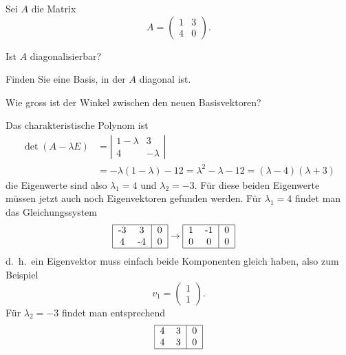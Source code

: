 Sei $A$ die Matrix
\[
A=\begin{pmatrix}
1&3\\
4&0
\end{pmatrix}.
\]
\begin{teilaufgaben}
\item Ist $A$ diagonalisierbar?
\item Finden Sie eine Basis, in der $A$ diagonal ist.
\item Wie gross ist der Winkel zwischen den neuen Basisvektoren?
\end{teilaufgaben}


\begin{loesung}
Das charakteristische Polynom ist
\begin{align*}
\det(A-\lambda E)
&=\left|\begin{matrix}
1-\lambda&3\\
4&-\lambda
\end{matrix}\right|
\\
&=-\lambda(1-\lambda)-12=\lambda^2-\lambda-12=(\lambda -4)(\lambda + 3)
\end{align*}
die Eigenwerte sind also $\lambda_1 = 4$ und $\lambda_2=-3$.
Für diese beiden Eigenwerte müssen jetzt auch noch Eigenvektoren
gefunden werden. Für $\lambda_1=4$ findet man das Gleichungssystem
\begin{align*}
\begin{tabular}{|cc|c|}
\hline
-3&3&0\\
4&-4&0\\
\hline
\end{tabular}
&\rightarrow
\begin{tabular}{|cc|c|}
\hline
1&-1&0\\
0&0&0\\
\hline
\end{tabular}
\end{align*}
d.~h.~ein Eigenvektor muss einfach beide Komponenten gleich haben, also
zum Beispiel
\[
v_1=\begin{pmatrix}1\\1\end{pmatrix}.
\]
Für $\lambda_2=-3$ findet man entsprechend
\begin{align*}
\begin{tabular}{|cc|c|}
\hline
4&3&0\\
4&3&0\\
\hline
\end{tabular}

\end{align*}
\end{loesung}
